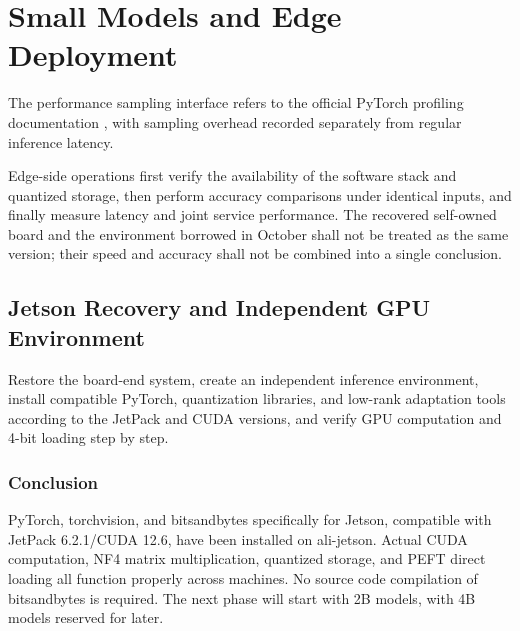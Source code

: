 \chapter{Small Models and Edge Deployment}
The performance sampling interface refers to the official PyTorch profiling documentation \cite{profiler}, with sampling overhead recorded separately from regular inference latency.


Edge-side operations first verify the availability of the software stack and quantized storage, then perform accuracy comparisons under identical inputs, and finally measure latency and joint service performance. The recovered self-owned board and the environment borrowed in October shall not be treated as the same version; their speed and accuracy shall not be combined into a single conclusion.

\section{Jetson Recovery and Independent GPU Environment}

\label{stage:s21}

Restore the board-end system, create an independent inference environment, install compatible PyTorch, quantization libraries, and low-rank adaptation tools according to the JetPack and CUDA versions, and verify GPU computation and 4-bit loading step by step.

\subsection{Conclusion}\label{s21-detail-1}

PyTorch, torchvision, and bitsandbytes specifically for Jetson, compatible with JetPack 6.2.1/CUDA 12.6, have been installed on ali-jetson. Actual CUDA computation, NF4 matrix multiplication, quantized storage, and PEFT direct loading all function properly across machines. No source code compilation of bitsandbytes is required. The next phase will start with 2B models, with 4B models reserved for later.

